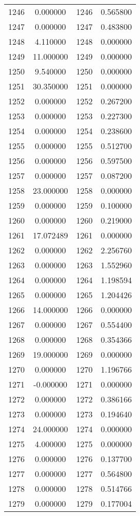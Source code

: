 \documentclass[12pt]{article}
\begin{document}
\begin{longtable}{@{}cccc@{}}
1246 & 0.000000 & 1246 & 0.565800 \\
1247 & 0.000000 & 1247 & 0.483800 \\
1248 & 4.110000 & 1248 & 0.000000 \\
1249 & 11.000000 & 1249 & 0.000000 \\
1250 & 9.540000 & 1250 & 0.000000 \\
1251 & 30.350000 & 1251 & 0.000000 \\
1252 & 0.000000 & 1252 & 0.267200 \\
1253 & 0.000000 & 1253 & 0.227300 \\
1254 & 0.000000 & 1254 & 0.238600 \\
1255 & 0.000000 & 1255 & 0.512700 \\
1256 & 0.000000 & 1256 & 0.597500 \\
1257 & 0.000000 & 1257 & 0.087200 \\
1258 & 23.000000 & 1258 & 0.000000 \\
1259 & 0.000000 & 1259 & 0.100000 \\
1260 & 0.000000 & 1260 & 0.219000 \\
1261 & 17.072489 & 1261 & 0.000000 \\
1262 & 0.000000 & 1262 & 2.256760 \\
1263 & 0.000000 & 1263 & 1.552960 \\
1264 & 0.000000 & 1264 & 1.198594 \\
1265 & 0.000000 & 1265 & 1.204426 \\
1266 & 14.000000 & 1266 & 0.000000 \\
1267 & 0.000000 & 1267 & 0.554400 \\
1268 & 0.000000 & 1268 & 0.354366 \\
1269 & 19.000000 & 1269 & 0.000000 \\
1270 & 0.000000 & 1270 & 1.196766 \\
1271 & -0.000000 & 1271 & 0.000000 \\
1272 & 0.000000 & 1272 & 0.386166 \\
1273 & 0.000000 & 1273 & 0.194640 \\
1274 & 24.000000 & 1274 & 0.000000 \\
1275 & 4.000000 & 1275 & 0.000000 \\
1276 & 0.000000 & 1276 & 0.137700 \\
1277 & 0.000000 & 1277 & 0.564800 \\
1278 & 0.000000 & 1278 & 0.514766 \\
1279 & 0.000000 & 1279 & 0.177004 \\

\end{longtable}
\end{document}

